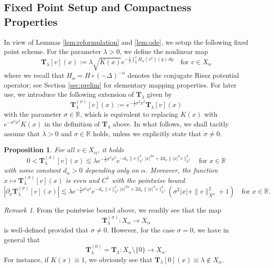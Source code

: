 \documentclass[reqno,10pt,a4paper]{amsart}
\newtheorem{prop}{Proposition}[section]
\theoremstyle{definition}
\theoremstyle{definition}
\theoremstyle{remark}
\theoremstyle{remark}
\newtheorem{remark}{Remark}[section]
\numberwithin{equation}{section}
\newcommand{\R}{\mathbb{R}}
\newcommand{\pt}{\partial}
\newcommand{\be}{\begin{equation}}
\newcommand{\ee}{\end{equation}}
\newcommand{\Ts}{\mathbf{T}}
\newcommand{\Tss}{\mathbf{T}^{(\sigma)}_\lambda}
\begin{document}
 
\subsection{Fixed Point Setup and Compactness Properties}
In view of Lemmas \ref{lem:reformulation} and \ref{lem:ode}, we setup the following fixed point scheme. For the parameter $\lambda > 0$, we define the nonlinear map
\be \label{def:Ts}
\boxed{\Ts_\lambda[v](x) := \lambda \sqrt{K(x)} e^{-\frac{1}{2} \int_0^x H_\alpha(v^2)(y) \, dy} \quad \mbox{for $v \in X_\alpha$}}
\ee
where we recall that $H_\alpha = H \circ (-\Delta)^{-\alpha}$ denotes the conjugate Riesz potential operator; see Section \ref{sec:prelim} for elementary mapping properties. For later use, we introduce the following extension of $\Ts_\lambda$ given by
\be
\boxed{\Tss[v](x) := e^{-\frac{1}{2} \sigma^2 x^2} \Ts_\lambda[v](x)}
\ee
with the parameter $\sigma \in \R$, which is equivalent to replacing $K(x)$ with $e^{-\sigma^2 x^2} K(x)$ in the definition of $\Ts_\lambda$ above. In what follows, we shall tacitly assume that $\lambda >0$ and $\sigma \in \R$ holds, unless we explicitly state that $\sigma \neq 0$.

\begin{prop} \label{prop:T_bounds}
For all $v \in X_\alpha$, it holds
$$
0 < \Tss[v](x) \lesssim \lambda e^{-\frac{1}{2} \sigma^2 x^2} e^{-d_\alpha \| v \|_{L^2}^2 |x|^{2 \alpha} + 2 d_\alpha \| |x|^{\alpha} v \|_{L^2}^2} \quad \mbox{for $x \in \R$}
$$
with some constant $d_\alpha > 0$ depending only on $\alpha$.  Moreover, the function $x \mapsto \Tss[v](x)$ is even and $C^1$ with the pointwise bound
$$
|\pt_x \Tss[v](x)| \lesssim \lambda e^{-\frac{1}{2} \sigma^2 x^2} e^{-d_\alpha \| v \|_{L^2}^2 |x|^{2 \alpha} + 2 d_\alpha \| |x|^{\alpha} v \|_{L^2}^2} \left ( \sigma^2 |x| + \| v \|_{X^\alpha}^2 + 1 \right ) \quad \mbox{for $x \in \R$}.
$$
\end{prop}

\begin{remark}
From the pointwise bound above, we readily see that the map 
$$
\Tss : X_\alpha \to X_\alpha
$$
is well-defined provided that $\sigma \neq 0$. However, for the case $\sigma=0$, we have in general that
$$
\Ts^{(0)}_\lambda = \Ts_\lambda : X_\alpha \setminus \{ 0 \} \to X_\alpha.
$$
For instance, if $K(x) \equiv 1$, we obviously see that $\Ts_\lambda[0](x) \equiv \lambda \not \in X_\alpha$.
\end{remark}
\end{document}
